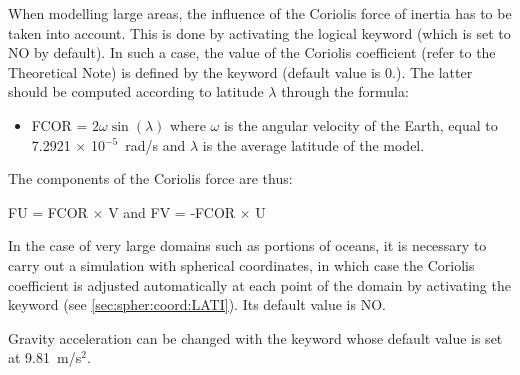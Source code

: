 When modelling large areas, the influence of the Coriolis force of inertia
has to be taken into account. This is done by activating the logical keyword
 (which is set to NO by default). In such a case, the value of
the Coriolis coefficient (refer to the Theoretical Note) is defined by the
keyword  (default value is 0.). The latter should
be computed according to latitude $\lambda$ through the formula:

\begin{itemize}
\item  FCOR = $2 \omega  \sin (\lambda )$ where $\omega$ is the angular
velocity of the Earth, equal to 7.2921 $\times$ 10$^{-5}$~rad/s
and $\lambda$ is the average latitude of the model.
\end{itemize}

The components of the Coriolis force are thus:

FU = FCOR $\times$ V          and          FV = -FCOR $\times$ U

In the case of very large domains such as portions of oceans, it is necessary
to carry out a simulation with spherical coordinates, in which case the
Coriolis coefficient is adjusted automatically at each point of the domain
by activating the keyword 
(see \ref{sec:spher:coord:LATI}).
Its default value is NO.

Gravity acceleration can be changed with the keyword 
whose default value is set at 9.81~m/s$^2$.
